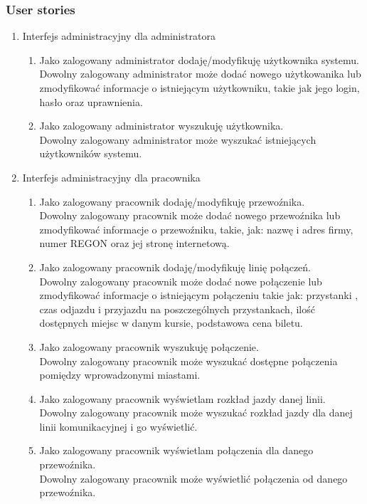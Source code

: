 \documentclass[10pt,a4paper]{article}
\begin{document}
\subsubsection*{User stories}
\begin{enumerate}
	\bfseries
	\item Interfejs administracyjny dla administratora
	\begin{enumerate}[label*=\arabic*.]
		\mdseries
		\item Jako zalogowany administrator dodaję/modyfikuję użytkownika systemu.\\
			Dowolny zalogowany administrator może dodać nowego użytkowanika lub zmodyfikować informacje o istniejącym użytkowniku, takie jak jego login, hasło oraz uprawnienia.
		\item Jako zalogowany administrator wyszukuję użytkownika. \\
		    Dowolny zalogowany administrator może wyszukać istniejących użytkowników systemu.
	\end{enumerate}
	\item Interfejs administracyjny dla pracownika
	\begin{enumerate}[label*=\arabic*.]
		\mdseries
		\item Jako zalogowany pracownik dodaję/modyfikuję przewoźnika. \\
			Dowolny zalogowany pracownik może dodać nowego przewoźnika lub zmodyfikować informacje o przewoźniku, takie, jak: nazwę i adres firmy, numer REGON oraz jej stronę internetową.
		\item Jako zalogowany pracownik dodaję/modyfikuję linię połączeń. \\
			Dowolny zalogowany pracownik może dodać nowe połączenie lub zmodyfikować informacje o istniejącym połączeniu takie jak: przystanki , czas odjazdu i przyjazdu na poszczególnych przystankach, ilość dostępnych miejsc w danym kursie, podstawowa cena biletu.
		\item Jako zalogowany pracownik wyszukuję połączenie. \\
		    Dowolny zalogowany pracownik może wyszukać dostępne połączenia pomiędzy
		    wprowadzonymi miastami.
	 	\item Jako zalogowany pracownik wyświetlam rozkład jazdy danej linii. \\
		    Dowolny zalogowany pracownik może wyszukać rozkład jazdy dla danej linii
		    komunikacyjnej i go wyświetlić.
    	\item Jako zalogowany pracownik wyświetlam połączenia dla danego przewoźnika. \\
		    Dowolny zalogowany pracownik może wyświetlić połączenia od danego przewoźnika.
	\end{enumerate}
\end{enumerate}
\end{document}
